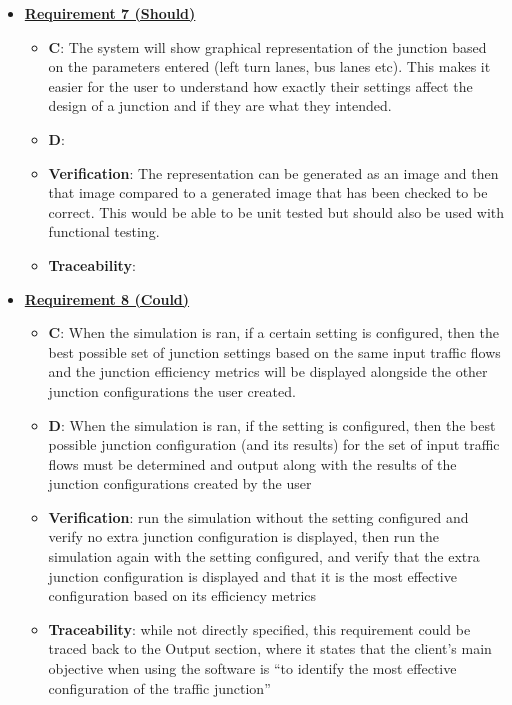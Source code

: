 \documentclass{article}
\begin{document}
\begin{itemize}
    \item \textbf{\underline{Requirement 7 (Should)}}
    \begin{itemize}
        \item \textbf{C}: The system will show graphical representation of the junction based on the 
            parameters entered (left turn lanes, bus lanes etc). This makes it easier for the user to 
            understand how exactly their settings affect the design of a junction and if they are what 
            they intended.
        \item \textbf{D}: 
        \item \textbf{Verification}: The representation can be generated as an image and then that image 
            compared to a generated image that has been checked to be correct. This would be able to be unit 
            tested but should also be used  with functional testing.
        \item\textbf{Traceability}: 
    \end{itemize}

    \item \textbf{\underline{Requirement 8 (Could)}}
    \begin{itemize}
        \item \textbf{C}: When the simulation is ran, if a certain setting is configured, then the best 
            possible set of junction settings based on the same input traffic flows and the 
            junction efficiency metrics will be displayed alongside the other junction 
            configurations the user created.
        \item \textbf{D}: When the simulation is ran, if the setting is configured, then the best 
            possible junction configuration (and its results) for the set of input traffic 
            flows must be determined and output along with the results of the junction 
            configurations created by the user
        \item \textbf{Verification}: run the simulation without the setting configured and verify 
            no extra junction configuration is displayed, then run the simulation again with 
            the setting configured, and verify that the extra junction configuration is displayed 
            and that it is the most effective configuration based on its efficiency metrics
        \item\textbf{Traceability}: while not directly specified, this requirement could be traced back 
            to the Output section, where it states that the client’s main objective when using 
            the software is “to identify the most effective configuration of the traffic junction”
    \end{itemize}


\end{itemize}
\end{document}
